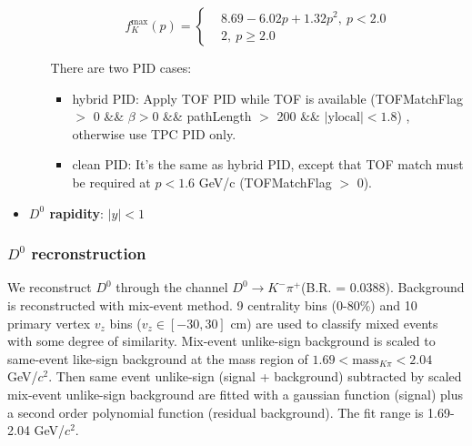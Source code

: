 \begin{itemize}
\begin{itemize}
\begin{equation}
f_K^{\mathrm{max}}(p) = \left\{
\begin{aligned}
&8.69 - 6.02p + 1.32p^2, ~ p < 2.0  \\
&2, ~ p \geq 2.0
\end{aligned}
\right.
\label{eq:nsigTofK1}
\end{equation}

There are two PID cases:
\begin{itemize}
\item hybrid PID: Apply TOF PID while TOF is available (TOFMatchFlag $>$ 0 \&\& $\beta > 0$  \&\& pathLength $>$ 200 \&\& $|\mathrm{ylocal}| < 1.8$) , otherwise use TPC PID only.
\item clean PID: It's the same as hybrid PID, except that TOF match must be required at $p < 1.6$ GeV/c (TOFMatchFlag $>$ 0). 
\end{itemize}
\end{itemize}

\item \textbf{$D^0$ rapidity}: $|y| < 1$
\end{itemize}

\subsubsection{$D^0$ recronstruction}
We reconstruct $D^0$ through the channel $D^0 \rightarrow K^-\pi^+$(B.R. = 0.0388). Background is reconstructed with mix-event method. 9 centrality bins (0-80\%) and 10 primary vertex $v_z$ bins ($v_z \in [-30,30]$ cm) are used to classify mixed events with some degree of similarity. Mix-event unlike-sign background is scaled to same-event like-sign background at the mass region of $1.69 < \mathrm{mass}_{K\pi} < 2.04$ GeV/$c^2$. Then same event unlike-sign (signal + background) subtracted by scaled mix-event unlike-sign background are fitted with a gaussian function (signal) plus a second order polynomial function (residual background). The fit range is 1.69-2.04 GeV/$c^2$.

